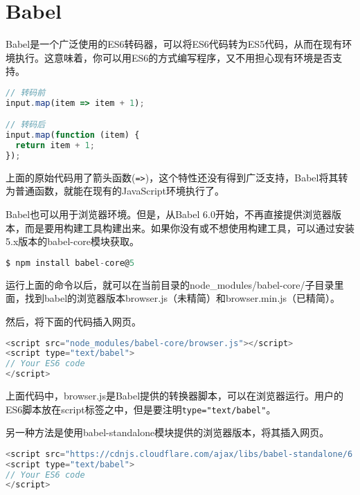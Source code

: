 \section{Babel}


Babel是一个广泛使用的ES6转码器，可以将ES6代码转为ES5代码，从而在现有环境执行。这意味着，你可以用ES6的方式编写程序，又不用担心现有环境是否支持。


\begin{lstlisting}[language=JavaScript]
// 转码前
input.map(item => item + 1);

// 转码后
input.map(function (item) {
  return item + 1;
});
\end{lstlisting}



上面的原始代码用了箭头函数(\texttt{=>})，这个特性还没有得到广泛支持，Babel将其转为普通函数，就能在现有的JavaScript环境执行了。



Babel也可以用于浏览器环境。但是，从Babel 6.0开始，不再直接提供浏览器版本，而是要用构建工具构建出来。如果你没有或不想使用构建工具，可以通过安装5.x版本的babel-core模块获取。



\begin{lstlisting}[language=JavaScript]
$ npm install babel-core@5
\end{lstlisting}

运行上面的命令以后，就可以在当前目录的node\_modules/babel-core/子目录里面，找到babel的浏览器版本browser.js（未精简）和browser.min.js（已精简）。

然后，将下面的代码插入网页。

\begin{lstlisting}[language=JavaScript]
<script src="node_modules/babel-core/browser.js"></script>
<script type="text/babel">
// Your ES6 code
</script>
\end{lstlisting}


上面代码中，browser.js是Babel提供的转换器脚本，可以在浏览器运行。用户的ES6脚本放在script标签之中，但是要注明\texttt{type="text/babel"}。

另一种方法是使用babel-standalone模块提供的浏览器版本，将其插入网页。


\begin{lstlisting}[language=JavaScript]
<script src="https://cdnjs.cloudflare.com/ajax/libs/babel-standalone/6.4.4/babel.min.js"></script>
<script type="text/babel">
// Your ES6 code
</script>
\end{lstlisting}


